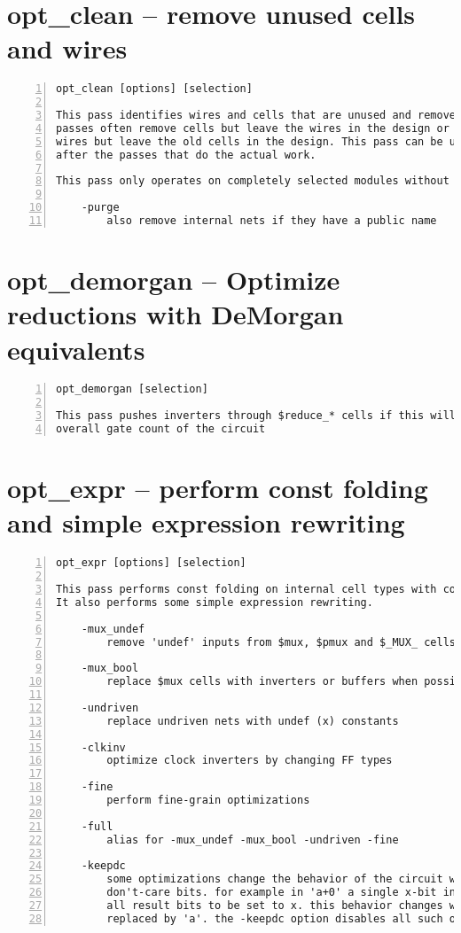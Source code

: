 \section{opt\_clean -- remove unused cells and wires}
\label{cmd:opt_clean}
\begin{lstlisting}[numbers=left,frame=single]
    opt_clean [options] [selection]

This pass identifies wires and cells that are unused and removes them. Other
passes often remove cells but leave the wires in the design or reconnect the
wires but leave the old cells in the design. This pass can be used to clean up
after the passes that do the actual work.

This pass only operates on completely selected modules without processes.

    -purge
        also remove internal nets if they have a public name
\end{lstlisting}

\section{opt\_demorgan -- Optimize reductions with DeMorgan equivalents}
\label{cmd:opt_demorgan}
\begin{lstlisting}[numbers=left,frame=single]
    opt_demorgan [selection]

This pass pushes inverters through $reduce_* cells if this will reduce the
overall gate count of the circuit
\end{lstlisting}

\section{opt\_expr -- perform const folding and simple expression rewriting}
\label{cmd:opt_expr}
\begin{lstlisting}[numbers=left,frame=single]
    opt_expr [options] [selection]

This pass performs const folding on internal cell types with constant inputs.
It also performs some simple expression rewriting.

    -mux_undef
        remove 'undef' inputs from $mux, $pmux and $_MUX_ cells

    -mux_bool
        replace $mux cells with inverters or buffers when possible

    -undriven
        replace undriven nets with undef (x) constants

    -clkinv
        optimize clock inverters by changing FF types

    -fine
        perform fine-grain optimizations

    -full
        alias for -mux_undef -mux_bool -undriven -fine

    -keepdc
        some optimizations change the behavior of the circuit with respect to
        don't-care bits. for example in 'a+0' a single x-bit in 'a' will cause
        all result bits to be set to x. this behavior changes when 'a+0' is
        replaced by 'a'. the -keepdc option disables all such optimizations.
\end{lstlisting}

